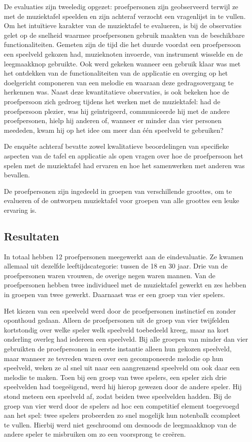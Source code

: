 \documentclass{acm}
\begin{document}
De evaluaties zijn tweeledig opgezet: proefpersonen zijn geobserveerd terwijl ze met de muziektafel speelden en zijn achteraf verzocht een vragenlijst in te vullen. Om het intu\"itieve karakter van de muziektafel te evalueren, is bij de observaties gelet op de snelheid waarmee proefpersonen gebruik maakten van de beschikbare functionaliteiten. Gemeten zijn de tijd die het duurde voordat een proefpersoon een speelveld gekozen had, muzieknoten invoerde, van instrument wisselde en de leegmaakknop gebruikte. Ook werd gekeken wanneer een gebruik klaar was met het ontdekken van de functionaliteiten van de applicatie en overging op het doelgericht componeren van een melodie en waaraan deze gedragsovergang te herkennen was. Naast deze kwantitatieve observaties, is ook bekeken hoe de proefpersoon zich gedroeg tijdens het werken met de muziektafel: had de proefpersoon plezier, was hij ge\"intrigeerd, communiceerde hij met de andere proefpersonen, hielp hij anderen of, wanneer er minder dan vier personen meededen, kwam hij op het idee om meer dan \'e\'en speelveld te gebruiken?

De enqu\^ete achteraf bevatte zowel kwalitatieve beoordelingen van specifieke aspecten van de tafel en applicatie als open vragen over hoe de proefpersoon het spelen met de muziektafel had ervaren en hoe het samenwerken met anderen was bevallen.

De proefpersonen zijn ingedeeld in groepen van verschillende groottes, om te evalueren of de ontworpen muziektafel voor groepen van alle groottes een leuke ervaring is.

\subsection{Resultaten}
In totaal hebben 12 proefpersonen meegewerkt aan de eindevaluatie. Ze kwamen allemaal uit dezelfde leeftijdscategorie: tussen de 18 en 30 jaar. Drie van de proefpersonen waren vrouwen, de overige negen waren mannen. Van de proefpersonen hebben twee individueel met de muziektafel gewerkt en zes hebben in groepen van twee gewerkt. Daarnaast was er een groep van vier spelers.

Het kiezen van een speelveld werd door de proefpersonen instinctief en zonder oponthoud gedaan. Alleen de proefpersonen uit de groep van vier twijfelden kortstondig over welke speler welk speelveld toebedeeld kreeg, maar na kort onderling overleg had iedereen een speelveld. Bij alle groepen van minder dan vier gebruikten de proefpersonen in eerste instantie alleen hun gekozen speelveld, maar wanneer ze tevreden waren over een gecomponeerde melodie op hun speelveld, weken ze al snel uit naar een aangrenzend speelveld om ook daar een melodie te maken. Toen bij een groep van twee spelers, een speler zich drie speelvelden had toege\"eigend, werd hij hierop gewezen door de andere speler. Hij stond meteen een speelveld af, zodat beiden twee speelvelden hadden. Bij de groep van vier werd door de spelers ad hoc een competitief element toegevoegd aan het spel: twee spelers probeerden zo snel mogelijk hun notenbalk ccompleet te vullen. Hierbij werd niet geschroomd om desnoods de leegmaakknop van de andere speler te misbruiken om zo een voorsprong te cre\"eren.
\end{document}
